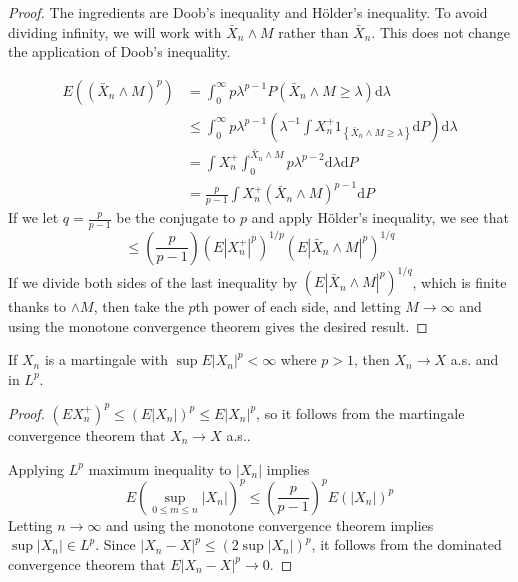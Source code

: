\begin{proof}
The ingredients are  Doob's inequality and H\"older's inequality. 
To avoid dividing infinity, we will work with $\bar{X}_n\wedge M$ rather than $\bar{X}_n$. This does not change the application of Doob's inequality.\par
\begin{align*}
E((\bar{X}_n\wedge M)^p)&=\int_0^\infty p\lambda^{p-1}P(\bar{X}_n\wedge M\geq \lambda)\mathrm{d}\lambda\\
&\le \int_0^\infty p\lambda^{p-1}(\lambda^{-1}\int X_n^+1_{\left \{ \bar{X}_n\wedge M\geq\lambda \right \} }\mathrm{d}P)\mathrm{d}\lambda\\
&=\int X_n^+\int_0^{\bar{X}_n\wedge M}p\lambda^{p-2}\mathrm{d}\lambda\mathrm{d}P\\
&=\frac{p}{p-1}\int X_n^+(\bar{X}_n\wedge M)^{p-1}\mathrm{d}P
\end{align*}
If we let $q=\frac{p}{p-1}$ be the conjugate to $p$ and apply H\"older's inequality, we see that \[\le (\frac{p}{p-1})(E\left|X_n^+\right|^p)^{1/p}(E\left|\bar{X}_n\wedge M\right|^p)^{1/q}\]
If we divide both sides of the last inequality by $(E\left|\bar{X}_n\wedge M\right|^p)^{1/q}$, which is finite thanks to $\wedge M$, then take the $p$th power of each side, and letting $M\to\infty$ and using the monotone convergence theorem gives the desired result.
\end{proof}
\begin{theorem}
If $X_n$ is a martingale with $\sup E\left|X_n\right|^p<\infty$ where $p>1$, then $X_n\to X$ a.s. and in $L^p$.
\end{theorem}
\begin{proof}
$(EX_n^+)^p\le (E\left|X_n\right|)^p\le E\left|X_n\right|^p$, so it follows from the martingale convergence theorem that $X_n\to X$ a.s..\par
Applying $L^p$ maximum inequality to $\left|X_n\right|$ implies \[E(\sup_{0\le m\le n}\left|X_n\right|)^p\le (\frac{p}{p-1})^pE(\left|X_n\right|)^p\]
Letting $n\to\infty$ and using the monotone convergence theorem implies $\sup\left|X_n\right|\in L^p$. Since $\left|X_n-X\right|^p\le (2\sup\left|X_n\right|)^p$, it follows from the dominated convergence theorem that $E\left|X_n-X\right|^p\to 0$.
\end{proof}

